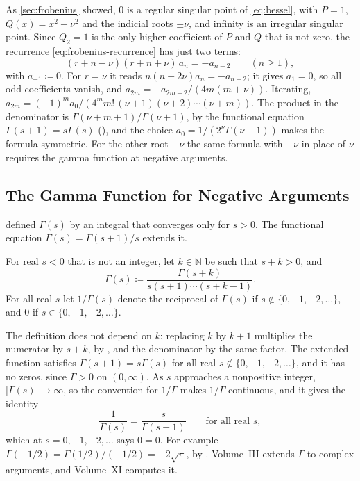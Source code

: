 As \cref{sec:frobenius} showed, $0$ is a regular singular point of \eqref{eq:bessel}, with $P=1$, $Q(x)=x^2-\nu^2$ and the indicial roots $\pm\nu$, and infinity is an irregular singular point. Since $Q_2=1$ is the only higher coefficient of $P$ and $Q$ that is not zero, the recurrence \eqref{eq:frobenius-recurrence} has just two terms:
\[
(r+n-\nu)(r+n+\nu)\,a_n=-a_{n-2}\qquad(n\ge1),
\]
with $a_{-1}\coloneqq0$. For $r=\nu$ it reads $n(n+2\nu)a_n=-a_{n-2}$; it gives $a_1=0$, so all odd coefficients vanish, and $a_{2m}=-a_{2m-2}/(4m(m+\nu))$. Iterating, $a_{2m}=(-1)^ma_0/(4^mm!\,(\nu+1)(\nu+2)\cdots(\nu+m))$. The product in the denominator is $\Gamma(\nu+m+1)/\Gamma(\nu+1)$, by the functional equation $\Gamma(s+1)=s\Gamma(s)$ (), and the choice $a_0=1/(2^\nu\Gamma(\nu+1))$ makes the formula symmetric. For the other root $-\nu$ the same formula with $-\nu$ in place of $\nu$ requires the gamma function at negative arguments.

\subsection{The Gamma Function for Negative Arguments}

 defined $\Gamma(s)$ by an integral that converges only for $s>0$. The functional equation $\Gamma(s)=\Gamma(s+1)/s$ extends it.

\begin{definition}
\label{def:gamma-extension}
For real $s<0$ that is not an integer, let $k\in\mathbb N$ be such that $s+k>0$, and
\[
\Gamma(s)\coloneqq\frac{\Gamma(s+k)}{s(s+1)\cdots(s+k-1)} .
\]
For all real $s$ let $1/\Gamma(s)$ denote the reciprocal of $\Gamma(s)$ if $s\notin\{0,-1,-2,\ldots\}$, and $0$ if $s\in\{0,-1,-2,\ldots\}$.
\end{definition}

The definition does not depend on $k$: replacing $k$ by $k+1$ multiplies the numerator by $s+k$, by , and the denominator by the same factor. The extended function satisfies $\Gamma(s+1)=s\Gamma(s)$ for all real $s\notin\{0,-1,-2,\ldots\}$, and it has no zeros, since $\Gamma>0$ on $(0,\infty)$. As $s$ approaches a nonpositive integer, $|\Gamma(s)|\to\infty$, so the convention for $1/\Gamma$ makes $1/\Gamma$ continuous, and it gives the identity
\begin{equation}
\frac1{\Gamma(s)}=\frac s{\Gamma(s+1)}\qquad\text{for all real }s,
\label{eq:rgamma}
\end{equation}
which at $s=0,-1,-2,\ldots$ says $0=0$. For example $\Gamma(-1/2)=\Gamma(1/2)/(-1/2)=-2\sqrt\pi$, by . Volume~III extends $\Gamma$ to complex arguments, and Volume~XI computes it.

